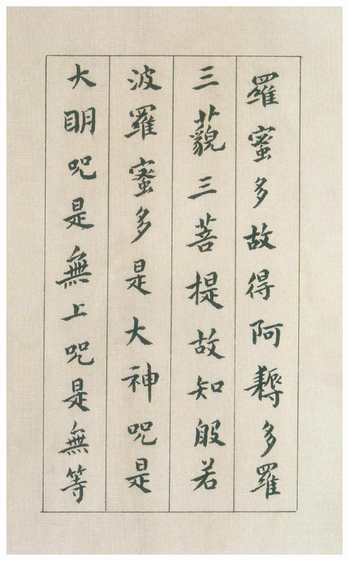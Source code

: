 \documentclass[a4paper,twoside]{article}
\begin{document}
\begin{figure}[ht]
\centering
\includegraphics[width=13.8cm]{images/fushan-6}
\end{figure}
\end{document}
